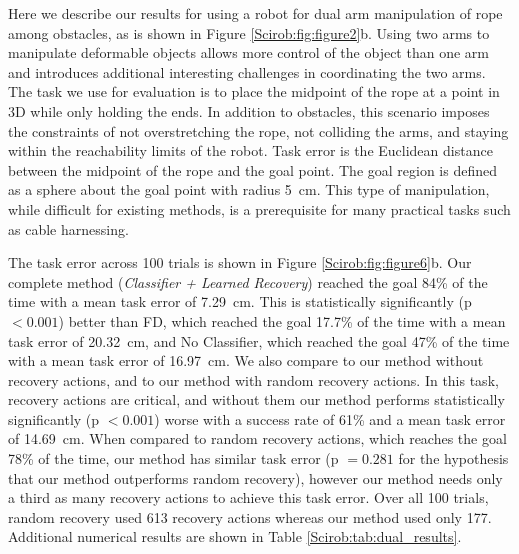 Here we describe our results for using a robot for dual arm manipulation of rope among obstacles, as is shown in Figure \ref{Scirob:fig:figure2}b. Using two arms to manipulate deformable objects allows more control of the object than one arm and introduces additional interesting challenges in coordinating the two arms. The task we use for evaluation is to place the midpoint of the rope at a point in 3D while only holding the ends. In addition to obstacles, this scenario imposes the constraints of not overstretching the rope, not colliding the arms, and staying within the reachability limits of the robot. Task error is the Euclidean distance between the midpoint of the rope and the goal point. The goal region is defined as a sphere about the goal point with radius \SI{5}{\centi\meter}. This type of manipulation, while difficult for existing methods, is a prerequisite for many practical tasks such as cable harnessing.

The task error across 100 trials is shown in Figure \ref{Scirob:fig:figure6}b. Our complete method (\textit{Classifier + Learned Recovery}) reached the goal 84\% of the time with a mean task error of \SI{7.29}{\centi\meter}. This is statistically significantly (p $<0.001$) better than FD, which reached the goal 17.7\% of the time with a mean task error of \SI{20.32}{\centi\meter}, and No Classifier, which reached the goal 47\% of the time with a mean task error of \SI{16.97}{\centi\meter}. We also compare to our method without recovery actions, and to our method with random recovery actions. In this task, recovery actions are critical, and without them our method performs statistically significantly (p $<0.001$) worse with a success rate of 61\% and a mean task error of \SI{14.69}{\centi\meter}. When compared to random recovery actions, which reaches the goal 78\% of the time, our method has similar task error (p $= 0.281$ for the hypothesis that our method outperforms random recovery), however our method needs only a third as many recovery actions to achieve this task error. Over all 100 trials, random recovery used 613 recovery actions whereas our method used only 177. Additional numerical results are shown in Table \ref{Scirob:tab:dual_results}.

